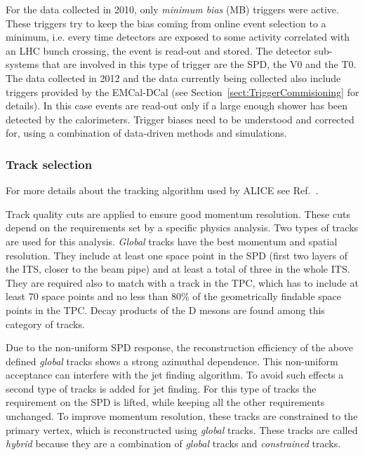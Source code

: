 \documentclass[12pt, a4paper, twoside, titlepage]{article}
\begin{document}
For the data collected in 2010, only \emph{minimum bias} (MB) triggers were active. These triggers
try to keep the bias coming from online event selection to a minimum, i.e. every time detectors
are exposed to some activity correlated with an LHC bunch crossing, the event is read-out and stored.
The detector sub-systems that are involved in this type of trigger are the SPD, the V0 and the T0.
The data collected in 2012 and the data currently being collected also include triggers
provided by the EMCal-DCal (see Section~\ref{sect:TriggerCommisioning} for details).
In this case events are read-out only if a large enough shower has been detected by the calorimeters.
Trigger biases need to be understood and corrected for, using a combination of data-driven methods and simulations.

\subsubsection{Track selection}
For more details about the tracking algorithm used by ALICE see Ref.~\cite{ALICE:2014b}.

Track quality cuts are applied to ensure good momentum resolution. These cuts
depend on the requirements set by a specific physics analysis.
Two types of tracks are used for this analysis. \emph{Global} tracks have the best
momentum and spatial resolution. They include at least one space point in the SPD (first two
layers of the ITS, closer to the beam pipe) and at least a total of three in the whole ITS. They are required also to
match with a track in the TPC, which has to include at least 70 space points and no less than 80\% of the geometrically findable 
space points in the TPC. Decay products of the D mesons are found among this category of tracks.

Due to the non-uniform SPD response, the reconstruction efficiency of the above defined \emph{global} tracks shows a strong azimuthal dependence.
This non-uniform acceptance can interfere with the jet finding algorithm. To avoid such effects a second type of tracks is added for jet finding.
For this type of tracks the requirement on the SPD is lifted, while keeping all the other requirements unchanged. To improve momentum resolution,
these tracks are constrained to the primary vertex, which is reconstructed using \emph{global} tracks. These tracks are called \emph{hybrid} because
they are a combination of \emph{global} tracks and \emph{constrained} tracks.
\end{document}
